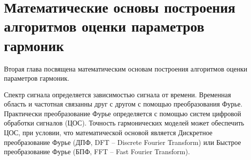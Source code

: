 %
%
%

\chapter{Математические основы построения алгоритмов оценки параметров гармоник} \label{ch:ch2}

Вторая глава посвящена математическим основам построения алгоритмов оценки параметров гармоник.

Спектр сигнала определяется зависимостью сигнала от времени. Временная область и частотная связанны друг с другом с помощью преобразования Фурье. Практически преобразование Фурье определяется с помощью систем цифровой обработки сигналов (ЦОС). Точность гармонических моделей может обеспечить ЦОС, при условии, что математической основой является Дискретное преобразование Фурье (ДПФ, DFT -- Discrete Fourier Transform) \cite{Digital_processing_Sergienko_2011} или Быстрое преобразование Фурье (БПФ, FFT -- Fast Fourier Transform). 
\cite{Time-frequency_Avramchuk_2009,Optimization_Computational_Altman2008,Building_suboptimal_Altman_2017}

